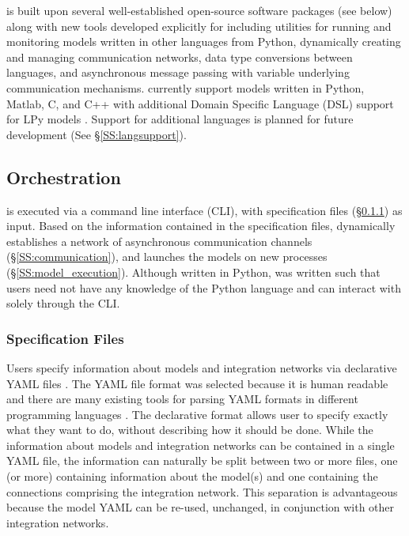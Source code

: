 \documentclass[journal]{IEEEtran}
\newcommand{\todo}[1]{{\color{red}{#1}}}
\newcommand{\pkg}{{\tt \todo{cis\_interface}}{}}
\newcommand{\pkgrun}{{\tt \todo{cisrun}}}
\begin{document}
{\pkg} is built upon several well-established open-source software packages (see below) along with new tools developed explicitly for {\pkg} including utilities for running and monitoring models written in other languages from Python, dynamically creating and managing communication networks, data type conversions between languages, and asynchronous message passing with variable underlying communication mechanisms. {\pkg} currently support models written in Python, Matlab, C, and C++ with additional Domain Specific Language (DSL) support for LPy models \citep{Boudon2012}. Support for additional languages is planned for future development (See \S\ref{SS:langsupport}).

\subsection{Orchestration}\label{SS:orchestration}
%
{\pkg} is executed via a command line interface (CLI), {\pkgrun} with specification files (\S\ref{SSS:yaml}) as input. Based on the information contained in the specification files, {\pkg} dynamically establishes a network of asynchronous communication channels (\S\ref{SS:communication}), and launches the models on new processes (\S\ref{SS:model_execution}). Although written in Python, {\pkg} was written such that users need not have any knowledge of the Python language and can interact with {\pkg} solely through the CLI.

\subsubsection{Specification Files}\label{SSS:yaml}
%
Users specify information about models and integration networks via declarative YAML files \citep{Ben-Kiki2009}. The YAML file format was selected because it is human readable and there are many existing tools for parsing YAML formats in different programming languages \citep[e.g.][]{Simonov2006,pyyaml,jsyaml}. The declarative format allows user to specify exactly what they want to do, without describing how it should be done. While the information about models and integration networks can be contained in a single YAML file, the information can naturally be split between two or more files, one (or more) containing information about the model(s) and one containing the connections comprising the integration network. This separation is advantageous because the model YAML can be re-used, unchanged, in conjunction with other integration networks. 
\end{document}
